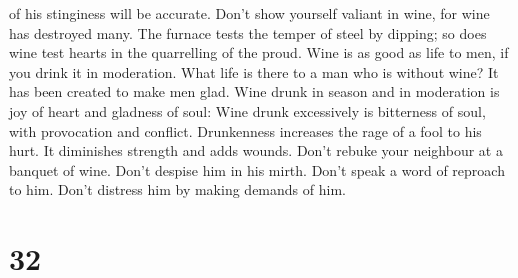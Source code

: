 of his stinginess will be accurate.  Don't show yourself
valiant in wine, for wine has destroyed many.  The furnace
tests the temper of steel by dipping; so does wine test hearts in the
quarrelling of the proud.  Wine is as good as life to men,
if you drink it in moderation. What life is there to a man who is
without wine? It has been created to make men glad.  Wine
drunk in season and in moderation is joy of heart and gladness of soul:
 Wine drunk excessively is bitterness of soul, with
provocation and conflict.  Drunkenness increases the rage
of a fool to his hurt. It diminishes strength and adds wounds.
 Don't rebuke your neighbour at a banquet of wine. Don't
despise him in his mirth. Don't speak a word of reproach to him. Don't
distress him by making demands of him.

\hypertarget{section-10}{%
\section{32}\label{section-10}}

